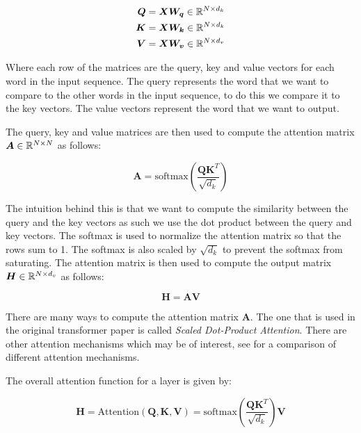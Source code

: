 \documentclass[../main.tex]{subfiles}
\begin{document}
\begin{align*}
	\bm{Q} &= \bm{X}\bm{W_q} \in \mathbb{R}^{N \times d_k}\\
	\bm{K} &= \bm{X}\bm{W_k} \in \mathbb{R}^{N \times d_k}\\
	\bm{V} &= \bm{X}\bm{W_v} \in \mathbb{R}^{N \times d_v}
\end{align*}


Where each row of the matrices are the query, key and value vectors for each word in the input sequence. The query represents the word that we want to compare to the other words in the input sequence, to do this we compare it to the key vectors. The value vectors represent the word that we want to output.

The query, key and value matrices are then used to compute the attention matrix $\bm{A} \in \mathbb{R}^{N \times N}$ as follows:

\begin{equation}
    \bm{A} = \text{softmax}\left(\frac{\bm{Q}\bm{K}^T}{\sqrt{d_k}}\right)
\end{equation}

\noi The intuition behind this is that we want to compute the similarity between the query and the key vectors as such we use the dot product between the query and key vectors. The softmax is used to normalize the attention matrix so that the rows sum to 1. The softmax is also scaled by $\sqrt{d_k}$ to prevent the softmax from saturating. The attention matrix is then used to compute the output matrix $\bm{H} \in \mathbb{R}^{N \times d_v}$ as follows:

\begin{equation}
    \bm{H} = \bm{A}\bm{V}
\end{equation}

\begin{note}

There are many ways to compute the attention matrix $\bm{A}$. The one that is used in the original transformer paper is called \emph{Scaled Dot-Product Attention}. There are other attention mechanisms which may be of interest, see \cite{weng2018attention} for a comparison of different attention mechanisms.

\end{note}

The overall attention function for a layer is given by:

\begin{equation}
    \bm{H} =\text{Attention}(\bm{Q}, \bm{K}, \bm{V}) = \text{softmax}\left(\frac{\bm{Q}\bm{K}^T}{\sqrt{d_k}}\right)\bm{V}
\end{equation}
\end{document}
